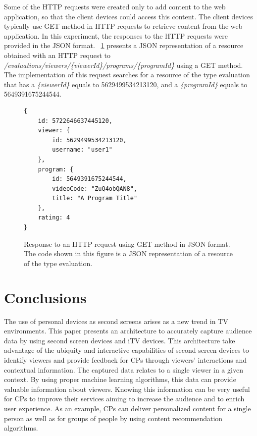 \documentclass[journal]{IEEEtran}
\begin{document}
Some of the HTTP requests were created only to add content to the web application, so that the client devices could access this content. The client devices typically use GET method in HTTP requests to retrieve content from the web application. In this experiment, the responses to the HTTP requests were provided in the JSON format. \figurename{~\ref{fig_response_json}} presents a JSON representation of a resource obtained with an HTTP request to \emph{/evaluations/viewers/\{viewerId\}/programs/\{programId\}} using a GET method. The implementation of this request searches for a resource of the type evaluation that has a \emph{\{viewerId\}} equals to 5629499534213120, and a \emph{\{programId\}} equals to 5649391675244544.

\begin{figure}
\begin{verbatim}
{
    id: 5722646637445120,
    viewer: {
        id: 5629499534213120,
        username: "user1"
    },
    program: {
        id: 5649391675244544,
        videoCode: "ZuQ4obQAN8",
        title: "A Program Title"
    },
    rating: 4
}
\end{verbatim}
\caption{Response to an HTTP request using GET method in JSON format. The code shown in this figure is a JSON representation of a resource of the type evaluation.}
\label{fig_response_json}
\end{figure}



\section{Conclusions}
\label{sec_conclusions}

The use of personal devices as second screens arises as a new trend in TV environments. This paper presents an architecture to accurately capture audience data by using second screen devices and iTV devices. This architecture take advantage of the ubiquity and interactive capabilities of second screen devices to identify viewers and provide feedback for CPs through viewers' interactions and contextual information. The captured data relates to a single viewer in a given context. By using proper machine learning algorithms, this data can provide valuable information about viewers. Knowing this information can be very useful for CPs to improve their services aiming to increase the audience and to enrich user experience. As an example, CPs can deliver personalized content for a single person as well as for groups of people by using content recommendation algorithms.
\end{document}
